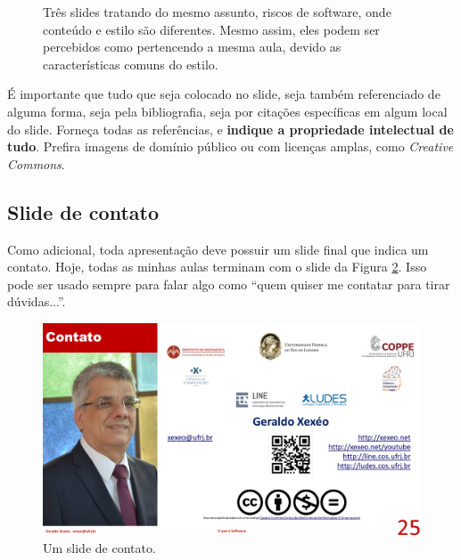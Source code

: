 \begin{figure}
    \centering
\caption{Três slides tratando do mesmo assunto, riscos de software, onde conteúdo e estilo são diferentes. Mesmo assim, eles podem ser percebidos como pertencendo a mesma aula, devido as características comuns do estilo.}
\label{fig:tres}
\end{figure}


É importante que tudo que seja colocado no slide, seja também referenciado de alguma forma, seja pela bibliografia, seja por citações específicas em algum local do slide.
Forneça todas as referências, e \textbf{indique a propriedade intelectual de tudo}. Prefira imagens de domínio público ou com licenças amplas, como \textit{Creative Commons}.


\subsection{Slide de contato}

Como adicional, toda apresentação deve possuir um slide final que indica um contato. Hoje, todas as minhas aulas terminam com o slide da Figura \ref{fig:fim}. Isso pode ser usado sempre para falar algo como ``quem quiser me contatar para tirar dúvidas...''.

\begin{figure}[h]
    \centering
    \includegraphics[width=\tam\linewidth,frame]{imagens/fim.png}
    \caption{Um slide de contato.}
    \label{fig:fim}
\end{figure}

